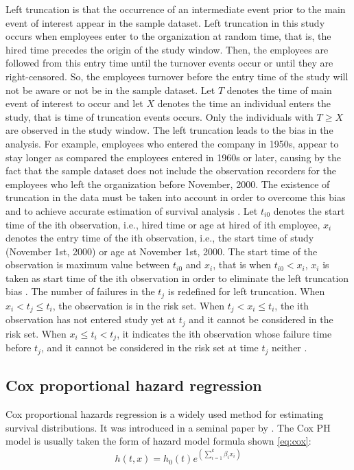Left truncation is that the occurrence of an intermediate event prior to the main event of interest appear in the sample dataset. Left truncation in this study occurs when employees enter to the organization at random time, that is, the hired time precedes the origin of the study window. Then, the employees are followed from this entry time until the turnover events occur or until they are right-censored. So, the employees turnover before the entry time of the study will not be aware or not be in the sample dataset. Let $T$ denotes the time of main event of interest to occur and let $X$ denotes the time an individual enters the study, that is time of truncation events occurs. Only the individuals with $T \geq X$ are observed in the study window. The left truncation leads to the bias in the analysis. For example, employees who entered the company in 1950s, appear to stay longer as compared the employees entered in 1960s or later, causing by the fact that the sample dataset does not include the observation recorders for the employees who left the organization before November, 2000. The existence of truncation in the data must be taken into account in order to overcome this bias and to achieve accurate estimation of survival analysis \citep{carrion2010}. Let $t_{i0}$ denotes the start time of the ith observation, i.e., hired time or age at hired of ith employee, $x_{i}$ denotes the entry time of the ith observation, i.e., the start time of study (November 1st, 2000) or age at November 1st, 2000. The start time of the observation is maximum value between $t_{i0}$ and $x_i$, that is when $t_{i0} < x_i $, $x_i$ is taken as start time of the ith observation in order to eliminate the left truncation bias \citep{allison1995}. The number of failures in the $t_j$ is redefined for left truncation. When $x_i < t_j \le t_i$, the observation is in the risk set. When $t_{j} < x_i \le t_i$, the ith observation has not entered study yet at $t_j$ and it cannot be considered in the risk set. When $x_i \le t_i < t_j$, it indicates the ith observation whose failure time before $t_j$, and it cannot be considered in the risk set at time $t_j$ neither \citep{carrion2010}.

\subsection{Cox proportional hazard regression}
Cox proportional hazards regression is a widely used method for estimating survival distributions. It was introduced in a seminal paper by \citet{cox1972}. The Cox PH model is usually taken the form of hazard model formula shown \ref{eq:cox}:
\begin{equation}
\label{eq:cox}
h(t,x)=h_0(t)e^{(\sum_{i=1}^{k}\beta_ix_i)}
\end{equation}

